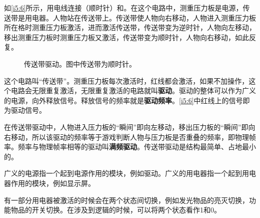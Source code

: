 \begin{example}{}{}

如\autoref{i5:6}所示，用电线连接（顺时针）和。在这个电路中，测重压力板是电源，传送带是用电器。人物站在传送带上。传送带使人物向右移动，人物进入测重压力板所在格时测重压力板激活，进而激活传送带，传送带变为逆时针，人物向左移动，移出测重压力板时测重压力板又激活，传送带变为顺时针，人物向右移动，如此反复。
\begin{figure}[H]
\centering
{}%
%
\caption{传送带驱动。图中传送带为顺时针。}
\label{i5:6}
\end{figure}

这个电路叫“传送带”。测重压力板每次激活时，红线都会激活，如果不加操作，这个电路会无限重复激活，无限重复激活的电路就叫\textbf{驱动}。驱动的整体可以作为广义的电源，向外释放信号。释放信号的频率就是\textbf{驱动频率}。\autoref{i5:6}中红线上的信号即为驱动信号。

在传送带驱动中，人物进入压力板的“瞬间”即向左移动，移出压力板的“瞬间”即向右移动，所以该驱动的频率等于游戏判断人物与压力板是否重叠的频率，即物理帧率。频率与物理帧率相等的驱动叫\textbf{满频驱动}。传送带驱动是结构最简单、占地最小的。
\end{example}

广义的电源指一个起到电源作用的模块，例如驱动。广义的用电器指一个起到用电器作用的模块，例如显示屏。

有一部分用电器被激活的时候会在两个状态间切换，例如发光物品的亮灭切换，功能物品的开关切换。在涉及到逻辑的时候，可以将两个状态看作1和0。

